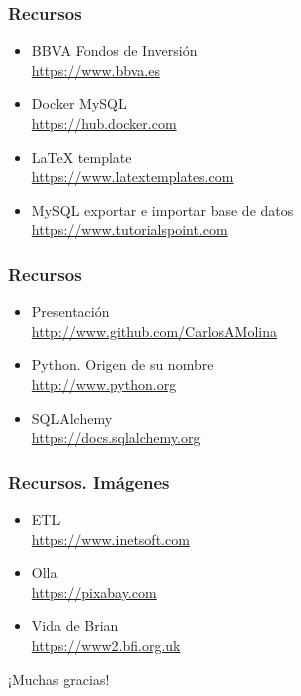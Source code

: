 \documentclass{beamer}
\begin{document}
\begin{frame}
\frametitle{Recursos}
\begin{itemize}
\item BBVA Fondos de Inversión\\
\href{https://www.bbva.es/personas/productos/fondos/por-tipo-de-activo.html}{https://www.bbva.es}
\item Docker MySQL\\
\href{https://hub.docker.com/\_/mysql/}{https://hub.docker.com}
\item LaTeX template\\
\href{https://www.latextemplates.com/template/beamer-presentation}{https://www.latextemplates.com}
\item MySQL exportar e importar base de datos\\
\href{https://www.tutorialspoint.com/mysql/mysql-database-export.htm}{https://www.tutorialspoint.com}\\
\end{itemize}
\end{frame}

\begin{frame}
\frametitle{Recursos}
\begin{itemize}
\item Presentación\\
\href{https://github.com/CarlosAMolina/workshop-python-pandas}{http://www.github.com/CarlosAMolina}
\item Python. Origen de su nombre\\
\href{http://www.python.org/doc/faq/general/\#why-is-it-called-python}{http://www.python.org}
\item SQLAlchemy\\
\href{https://docs.sqlalchemy.org/en/14/core/engines.html}{https://docs.sqlalchemy.org}
\end{itemize}
\end{frame}

\begin{frame}
\frametitle{Recursos. Imágenes}
\begin{itemize}
\item ETL\\
\href{https://www.inetsoft.com/business/solutions/etl\_definition\_advantages\_and\_disadvantages/}{https://www.inetsoft.com}
\item Olla\\
\href{https://pixabay.com/vectors/fire-flame-pot-burn-boil-stew-40252/}{https://pixabay.com}
\item Vida de Brian\\
\href{https://www2.bfi.org.uk/news-opinion/news-bfi/announcements/bfi-announce-programme-its-monty-python-50}{https://www2.bfi.org.uk}
\end{itemize}
\end{frame}

\begin{frame}
\Huge{\centerline{¡Muchas gracias!}}
\end{frame}
\end{document}
